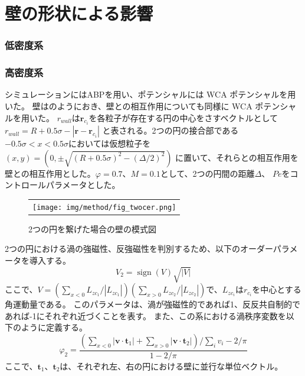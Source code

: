 \documentclass[/Users/ikedahajime/GitHub/reserch/master_report/thesis]{subfiles}
\begin{document}
\section{壁の形状による影響}\label{sec:res_abp_twowall}
\subsubsection{低密度系}
\subsubsection{高密度系}
シミュレーションにはABPを用い、ポテンシャルには WCA ポテンシャルを用いた。
壁はのようにおき、壁との相互作用についても同様に WCA ポテンシャルを用いた。
$r_{wall}$は$\bm{r}_{c_i}$を各粒子が存在する円の中心をさすベクトルとして$r_{wall}=R+0.5\sigma-\left|\bm{r}-\bm{r}_{c_i}\right|$
と表される。2つの円の接合部である$-0.5\sigma<x<0.5\sigma$においては仮想粒子を$(x,y)=(0,\pm\sqrt{(R+0.5\sigma)^2-(\Delta/2)^2})$
に置いて、それらとの相互作用を壁との相互作用とした。$\varphi=0.7、M=0.1$として、2つの円間の距離$\Delta$、
$Pe$をコントロールパラメータとした。
\begin{figure}
    \centering
    \begin{tabular}{c}
        \begin{minipage}{0.4\hsize}
            \texttt{[image: img/method/fig\_twocer.png]}
        \end{minipage}
    \end{tabular}
    \caption[Four sample images]
    {
        2つの円を繋げた場合の壁の模式図
    }
    \label{fig:wall_twowall}
\end{figure}

2つの円における渦の強磁性、反強磁性を判別するため、以下のオーダーパラメータを導入する。
\begin{equation}
    V_2={\mathop{\mathrm{sign}}\nolimits} (V)\sqrt{|V|}
\end{equation}
ここで、$V=(\sum_{x<0} L_{zc_1}/|L_{zc_1}|)(\sum_{x>0}L_{zc_2}/|L_{zc_2}|)$で、$L_{zc_i}$は$r_{c_i}$を中心とする角運動量である。
このパラメータは、渦が強磁性的であれば1、反反共自制的であれば-1にそれぞれ近づくことを表す。
また、この系における渦秩序変数を以下のように定義する。
\begin{equation}
    \varphi_2=\frac{(\sum_{x<0} \left|\bm{v}\cdot \bm{t}_{1} \right|+\sum_{x>0} \left|\bm{v}\cdot \bm{t}_{2} \right|)/\sum_i v_i -2/\pi}{1-2/\pi}
\end{equation}
ここで、$\bm{t}_1、\bm{t}_2$は、それぞれ左、右の円における壁に並行な単位ベクトル。
\end{document}
